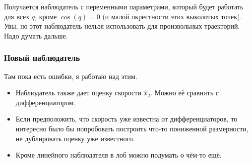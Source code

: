 \documentclass{article}
\begin{document}
Получается наблюдатель с переменными параметрами, который будет работать для всех $q$, кроме $\cos(q)=0$ (и малой окрестности этих выколотых точек). Увы, но этот наблюдатель нельзя использовать для произвольных траекторий. Надо думать дальше.

\subsubsection{Новый наблюдатель}
%
Там пока есть ошибки, я работаю над этим.

\begin{itemize}
\item Наблюдатель также дает оценку скорости $\hat{x}_2$. Можно её сравнить с дифференциатором.
\item Если предположить, что скорость уже известна от дифференциаторов, то интересно было бы попробовать построить что-то пониженной размерности, не дублировать оценку уже известного. 
\item Кроме линейного наблюдателя в лоб можно подумать о чём-то ещё.
\end{itemize}
\end{document}

